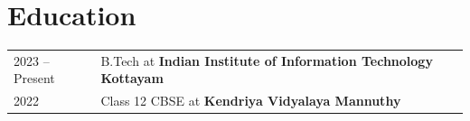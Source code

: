 \documentclass[a4paper,11pt]{article}  %
\begin{document}
\section{Education}
\begin{tabularx}{\linewidth}{@{}l X r@{}}
2023 -- Present & B.Tech at \textbf{Indian Institute of Information Technology Kottayam} & \\[3pt]
2022            & Class 12 CBSE at \textbf{Kendriya Vidyalaya Mannuthy}                  & \\
\end{tabularx}
\end{document}
